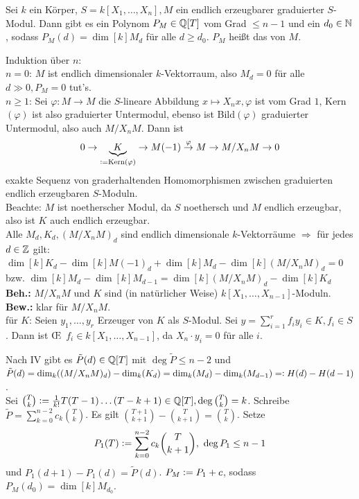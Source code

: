 \documentclass[a4paper, 10pt]{report}
\begin{document}
\begin{Satz}
\label{Satz6}
  Sei $k$ ein Körper, $S=k[X_1, \dots, X_n], M$ ein endlich erzeugbarer
  graduierter $S$-Modul. Dann gibt es ein Polynom $P_M \in \mathbb{Q}[T]$ vom
  Grad $\le n -1 $ und ein $d_0 \in \mathbb{N}$, sodass $P_M(d) = \dim[k]{M_d}$ für alle $d \ge d_0$. $P_M$ heißt das
   von $M$.
\end{Satz}

\begin{Bew}
  Induktion über $n$:\\
  $n=0$: $M$ ist endlich dimensionaler $k$-Vektorraum, also $M_d=0$ für alle $d
  \gg 0, P_M = 0$ tut's.\\
  $n\geq 1$: Sei $\varphi: M \to M$ die $S$-lineare Abbildung $x \mapsto X_n x,
  \varphi$ ist vom Grad $1$, Kern$(\varphi)$ ist also graduierter Untermodul,
  ebenso ist Bild$(\varphi)$ graduierter Untermodul, also auch $M/X_n M$.
  Dann ist
  \[
  0 \to \underset{\mathrel{\mathop:}=\mathrm{Kern}(\varphi)}{\underbrace{K}} \to M(-1) \overset{\varphi}{\to}
  M \to M/X_n M \to 0
  \]
  exakte Sequenz von graderhaltenden Homomorphismen zwischen graduierten\\
  endlich erzeugbaren $S$-Moduln.\\
  Beachte: $M$ ist noetherscher Modul, da $S$ noethersch und $M$ endlich
  erzeugbar, also ist $K$ auch endlich erzeugbar.\\
  Alle $M_d, K_d,(M/X_n M)_d$ sind endlich dimensionale $k$-Vektorräume
  $\Rightarrow$ für jedes $d \in \mathbb{Z}$ gilt: $\dim[k]{K_d} -
  \dim[k]{M(-1)_d} + \dim[k]{M_d} - \dim[k]{(M/X_n M)_d} = 0$
  bzw. $\dim[k]{M_d} - \dim[k]{M_{d-1}} = \dim[k]{(M/X_n M)_d}
  - \dim[k]{K_d}$\\
  \textbf{Beh.:} $M/X_n M$ und $K$ sind (in natürlicher Weise) $k[X_1, \dots,
  X_{n-1}]$-Moduln.\\
  \textbf{Bew.:} klar für $M/X_n M$.\\
  für $K$: Seien $y_1, \dots, y_r$ Erzeuger von $K$ als $S$-Modul. Sei $y =
  \sum_{i = 1}^r f_i y_i \in K, f_i \in S$.
  Dann ist \OE\ $f_i \in k[X_1, \dots, X_{n-1}]$, da $X_n \cdot y_i = 0$ für
  alle $i$.
  
  Nach IV gibt es $\tilde{P}(d) \in \mathbb{Q}[T]$ mit $\deg{\tilde{P}}
  \le n-2$ und $\tilde{P}(d) = \dim[k]{(M/X_n M)_d} - \dim[k]{K_d} =
  \dim[k]{M_d} - \dim[k]{M_{d-1}} \defeql H(d) - H(d-1)$.\\
  Sei $\binom{T}{k} \mathrel{\mathop:}= \frac{1}{k!} T (T-1) \dots (T-k+1) \in
  \mathbb{Q}[T], \deg{\binom{T}{k}} = k$.
  Schreibe $\tilde{P} = \sum_{k = 0}^{n-2} c_k \binom{T}{k}$. Es gilt
  $\binom{T+1}{k+1} - \binom{T}{k+1} = \binom{T}{k}$. Setze
  \[
  P_1(T) \mathrel{\mathop:}= \sum_{k=0}^{n-2} c_k \binom{T}{k+1},\ \deg{P_1} \le n-1
  \]
  und $P_1(d+1)-P_1(d) = \tilde{P}(d)$. $P_M \mathrel{\mathop:}= P_1 +c$, sodass $P_M(d_0) =
  \dim[k]{M_{d_0}}$.
\end{Bew}
\end{document}
